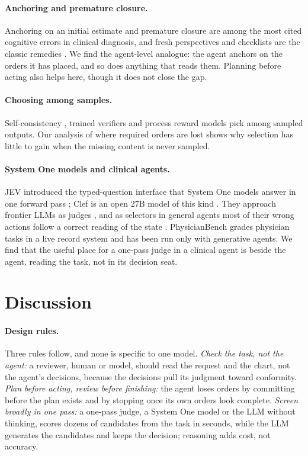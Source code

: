 \documentclass[11pt]{article}
\begin{document}
\paragraph{Anchoring and premature closure.} Anchoring on an initial estimate \citep{tversky1974heuristics} and
premature closure are among the most cited cognitive errors in clinical diagnosis, and fresh perspectives and
checklists are the classic remedies \citep{croskerry2003cognitive,haynes2009checklist}. We find the agent-level
analogue: the agent anchors on the orders it has placed, and so does anything that reads them. Planning before
acting \citep{wang2023planandsolve} also helps here, though it does not close the gap.

\paragraph{Choosing among samples.} Self-consistency \citep{wang2023selfconsistency}, trained verifiers
\citep{cobbe2021verifiers} and process reward models \citep{lightman2024verify} pick among sampled outputs. Our
analysis of where required orders are lost shows why selection has little to gain when the missing content is never
sampled.

\paragraph{System One models and clinical agents.} JEV introduced the typed-question interface that System One models
answer in one forward pass \citep{typesafe2026jev}; Clef is an open 27B model of this kind \citep{clef2026}. They
approach frontier LLMs as judges \citep{li2026jevjudge}, and as selectors in general agents most of their wrong
actions follow a correct reading of the state \citep{li2026reading}. PhysicianBench \citep{physicianbench2026} grades
physician tasks in a live record system and has been run only with generative agents. We find that the useful place
for a one-pass judge in a clinical agent is beside the agent, reading the task, not in its decision seat.

\section{Discussion}

\paragraph{Design rules.} Three rules follow, and none is specific to one model. \emph{Check the task, not the
agent:} a reviewer, human or model, should read the request and the chart, not the agent's decisions, because the
decisions pull its judgment toward conformity. \emph{Plan before acting, review before finishing:} the agent loses
orders by committing before the plan exists and by stopping once its own orders look complete. \emph{Screen broadly
in one pass:} a one-pass judge, a System One model or the LLM without thinking, scores dozens of candidates from the
task in seconds, while the LLM generates the candidates and keeps the decision; reasoning adds cost, not accuracy.
\end{document}
